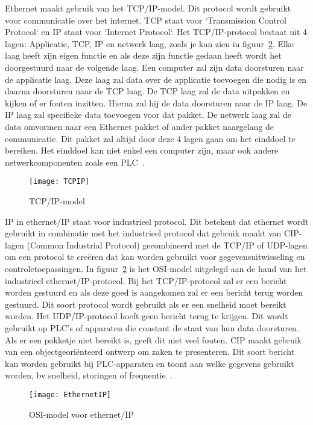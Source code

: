 Ethernet maakt gebruik van het TCP/IP-model. Dit protocol wordt gebruikt voor communicatie over het internet. TCP staat voor `Transmission Control Protocol` en IP staat voor `Internet Protocol`. Het TCP/IP-protocol bestaat uit 4 lagen: Applicatie, TCP, IP en netwerk laag, zoals je kan zien in figuur~\ref{fig:2.10}. Elke laag heeft zijn eigen functie en als deze zijn functie gedaan heeft wordt het doorgestuurd naar de volgende laag. Een computer zal zijn data doorsturen naar de applicatie laag. Deze laag zal data over de applicatie toevoegen die nodig is en daarna doorsturen naar de TCP laag. De TCP laag zal de data uitpakken en kijken of er fouten inzitten. Hierna zal hij de data doorsturen naar de IP laag. De IP laag zal specifieke data toevoegen voor dat pakket. De netwerk laag zal de data omvormen naar een Ethernet pakket of ander pakket naargelang de communicatie. Dit pakket zal altijd door deze 4 lagen gaan om het einddoel te bereiken. Het einddoel kan niet enkel een computer zijn, maar ook andere netwerkcomponenten zoals een PLC~\autocite{Realpars2019a}.
\begin{figure}
    \texttt{[image: TCPIP]}
    \caption{TCP/IP-model\autocite{GeeksforGeeks2020a} \label{fig:2.9}} 
    
\end{figure}

IP in ethernet/IP staat voor industrieel protocol. Dit betekent dat ethernet wordt gebruikt in combinatie met het industrieel protocol dat gebruik maakt van CIP-lagen (Common Industrial Protocol) gecombineerd met de TCP/IP of UDP-lagen om een protocol te creëren dat kan worden gebruikt voor gegevensuitwisseling en controletoepassingen. In figuur~\ref{fig:2.10} is het OSI-model uitgelegd aan de hand van het industrieel ethernet/IP-protocol. Bij het TCP/IP-protocol zal er een bericht worden gestuurd en als deze goed is aangekomen zal er een bericht terug worden gestuurd. Dit soort protocol wordt gebruikt als er een snelheid moet bereikt worden. Het UDP/IP-protocol hoeft geen bericht terug te krijgen. Dit wordt gebruikt op PLC's of apparaten die constant de staat van hun data doorsturen. Als er een pakketje niet bereikt is, geeft dit niet veel fouten. CIP maakt gebruik van een objectgeoriënteerd ontwerp om zaken te presenteren. Dit soort bericht kan worden gebruikt bij PLC-apparaten en toont aan welke gegevens gebruikt worden, bv snelheid, storingen of frequentie~\autocite{Realpars2019a}.
\begin{figure} 
    \texttt{[image: EthernetIP]}
    \caption{OSI-model voor ethernet/IP\autocite{Realpars2019a} \label{fig:2.10}} 
\end{figure}

